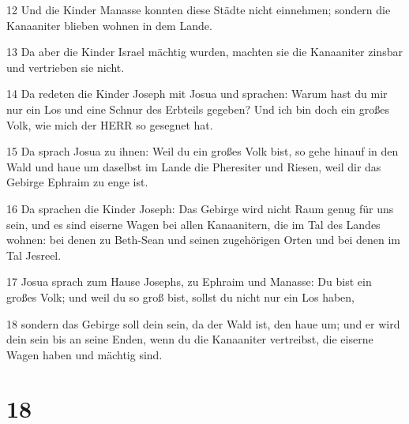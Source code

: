 \par 12 Und die Kinder Manasse konnten diese Städte nicht einnehmen; sondern die Kanaaniter blieben wohnen in dem Lande.
\par 13 Da aber die Kinder Israel mächtig wurden, machten sie die Kanaaniter zinsbar und vertrieben sie nicht.
\par 14 Da redeten die Kinder Joseph mit Josua und sprachen: Warum hast du mir nur ein Los und eine Schnur des Erbteils gegeben? Und ich bin doch ein großes Volk, wie mich der HERR so gesegnet hat.
\par 15 Da sprach Josua zu ihnen: Weil du ein großes Volk bist, so gehe hinauf in den Wald und haue um daselbst im Lande die Pheresiter und Riesen, weil dir das Gebirge Ephraim zu enge ist.
\par 16 Da sprachen die Kinder Joseph: Das Gebirge wird nicht Raum genug für uns sein, und es sind eiserne Wagen bei allen Kanaanitern, die im Tal des Landes wohnen: bei denen zu Beth-Sean und seinen zugehörigen Orten und bei denen im Tal Jesreel.
\par 17 Josua sprach zum Hause Josephs, zu Ephraim und Manasse: Du bist ein großes Volk; und weil du so groß bist, sollst du nicht nur ein Los haben,
\par 18 sondern das Gebirge soll dein sein, da der Wald ist, den haue um; und er wird dein sein bis an seine Enden, wenn du die Kanaaniter vertreibst, die eiserne Wagen haben und mächtig sind.

\chapter{18}

